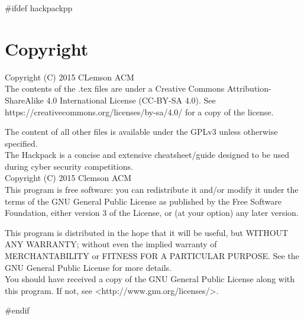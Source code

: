 #ifdef hackpackpp
\section*{Copyright}
Copyright (C) 2015 CLemson ACM \\
The contents of the .tex files are under a Creative Commons Attribution-ShareAlike 4.0
International License (CC-BY-SA 4.0). 
See https://creativecommons.org/licenses/by-sa/4.0/ for a copy of the license.

The content of all other files is available under the GPLv3 unless otherwise specified. \\
The Hackpack is a concise and extensive cheatsheet/guide designed to be used during cyber security competitions. \\
Copyright (C) 2015  Clemson ACM \\

This program is free software: you can redistribute it and/or modify
it under the terms of the GNU General Public License as published by
the Free Software Foundation, either version 3 of the License, or
(at your option) any later version.

This program is distributed in the hope that it will be useful,
but WITHOUT ANY WARRANTY; without even the implied warranty of
MERCHANTABILITY or FITNESS FOR A PARTICULAR PURPOSE\@.  See the
GNU General Public License for more details. \\

You should have received a copy of the GNU General Public License
along with this program.  If not, see <http://www.gnu.org/licenses/>.

\break
#endif

